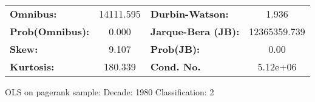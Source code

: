\begin{center}
\begin{tabular}{lccccc}
\end{tabular}
\begin{tabular}{lclc}
\textbf{Omnibus:}       & 14111.595 & \textbf{  Durbin-Watson:     } &      1.936    \\
\textbf{Prob(Omnibus):} &    0.000  & \textbf{  Jarque-Bera (JB):  } & 12365359.739  \\
\textbf{Skew:}          &    9.107  & \textbf{  Prob(JB):          } &       0.00    \\
\textbf{Kurtosis:}      &  180.339  & \textbf{  Cond. No.          } &   5.12e+06    \\
\bottomrule
\end{tabular}
\end{center}
\break
OLS on pagerank sample: Decade: 1980 Classification: 2
